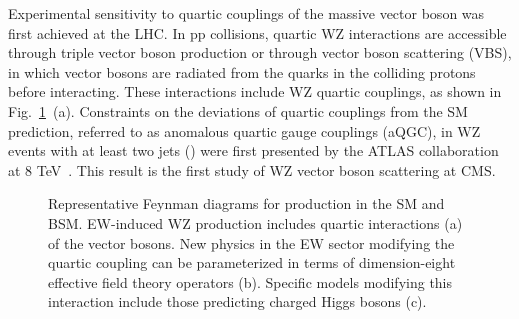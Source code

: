 Experimental sensitivity to quartic couplings of the massive vector boson 
was first achieved at the LHC.
In pp collisions, quartic WZ interactions are accessible through triple 
vector boson production or through vector boson scattering (VBS), 
in which vector bosons are radiated from the quarks in the colliding protons 
before interacting.
These interactions include WZ quartic couplings, as shown in Fig.~\ref{fig:feynmanDiagrams}~(a). 
Constraints on the deviations of quartic couplings from the SM prediction, 
referred to as anomalous quartic gauge couplings (aQGC), in 
WZ events with at least two jets (\WZjj) were first
presented by the ATLAS collaboration at 8 TeV~\cite{Aad:2016ett}. This result
is the first study of WZ vector boson scattering at CMS. 

\begin{figure}[htbp]
  \centering
   \qquad
   \qquad
   \qquad
  \caption{Representative Feynman diagrams for \WZjj production in the SM and BSM. 
  EW-induced WZ production includes quartic interactions (a) of the vector bosons.
  New physics in the EW sector modifying the quartic coupling 
  can be parameterized in terms of dimension-eight effective field theory operators (b).
  Specific models modifying this interaction include those predicting charged Higgs bosons (c).
  }
 \label{fig:feynmanDiagrams}
\end{figure}

